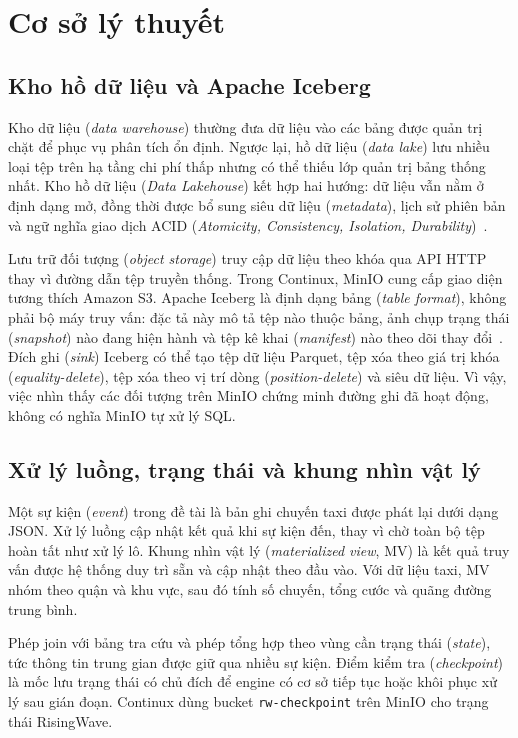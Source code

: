 \section{Cơ sở lý thuyết}\label{sec:background}

\subsection{Kho hồ dữ liệu và Apache Iceberg}
Kho dữ liệu (\emph{data warehouse}) thường đưa dữ liệu vào các bảng được quản trị chặt để phục vụ phân tích ổn định. Ngược lại, hồ dữ liệu (\emph{data lake}) lưu nhiều loại tệp trên hạ tầng chi phí thấp nhưng có thể thiếu lớp quản trị bảng thống nhất. Kho hồ dữ liệu (\emph{Data Lakehouse}) kết hợp hai hướng: dữ liệu vẫn nằm ở định dạng mở, đồng thời được bổ sung siêu dữ liệu (\emph{metadata}), lịch sử phiên bản và ngữ nghĩa giao dịch ACID (\emph{Atomicity, Consistency, Isolation, Durability})~\parencite{armbrust2021lakehouse}.

Lưu trữ đối tượng (\emph{object storage}) truy cập dữ liệu theo khóa qua API HTTP thay vì đường dẫn tệp truyền thống. Trong Continux, MinIO cung cấp giao diện tương thích Amazon S3. Apache Iceberg là định dạng bảng (\emph{table format}), không phải bộ máy truy vấn: đặc tả này mô tả tệp nào thuộc bảng, ảnh chụp trạng thái (\emph{snapshot}) nào đang hiện hành và tệp kê khai (\emph{manifest}) nào theo dõi thay đổi~\parencite{icebergdocs}. Đích ghi (\emph{sink}) Iceberg có thể tạo tệp dữ liệu Parquet, tệp xóa theo giá trị khóa (\emph{equality-delete}), tệp xóa theo vị trí dòng (\emph{position-delete}) và siêu dữ liệu. Vì vậy, việc nhìn thấy các đối tượng trên MinIO chứng minh đường ghi đã hoạt động, không có nghĩa MinIO tự xử lý SQL.

\subsection{Xử lý luồng, trạng thái và khung nhìn vật lý}
Một sự kiện (\emph{event}) trong đề tài là bản ghi chuyến taxi được phát lại dưới dạng JSON. Xử lý luồng cập nhật kết quả khi sự kiện đến, thay vì chờ toàn bộ tệp hoàn tất như xử lý lô. Khung nhìn vật lý (\emph{materialized view}, MV) là kết quả truy vấn được hệ thống duy trì sẵn và cập nhật theo đầu vào. Với dữ liệu taxi, MV nhóm theo quận và khu vực, sau đó tính số chuyến, tổng cước và quãng đường trung bình.

Phép join với bảng tra cứu và phép tổng hợp theo vùng cần trạng thái (\emph{state}), tức thông tin trung gian được giữ qua nhiều sự kiện. Điểm kiểm tra (\emph{checkpoint}) là mốc lưu trạng thái có chủ đích để engine có cơ sở tiếp tục hoặc khôi phục xử lý sau gián đoạn. Continux dùng bucket \texttt{rw-checkpoint} trên MinIO cho trạng thái RisingWave.


